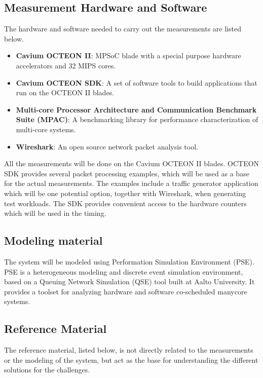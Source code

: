 \subsection{Measurement Hardware and Software}
The hardware and software needed to carry out the measurements are listed below.

\begin{itemize}

\item \textbf{Cavium OCTEON II}: MPSoC blade with a special purpose hardware accelerators and 32 MIPS cores.
\item \textbf{Cavium OCTEON SDK}: A set of software tools to build applications that run on the OCTEON II blades.
\item \textbf{Multi-core Processor Architecture and Communication Benchmark Suite (MPAC)}: A benchmarking library for performance characterization of multi-core systems.
\item \textbf{Wireshark}: An open source network packet analysis tool.

\end{itemize}

All the measurements will be done on the Cavium OCTEON II blades. OCTEON SDK provides several packet processing examples, which will be used as a base for the actual measurements. The examples include a traffic generator application which will be one potential option, together with Wireshark, when generating test workloads. The SDK provides convenient access to the hardware counters which will be used in the timing.

\subsection{Modeling material}
The system will be modeled using Performation Simulation Environment (PSE). PSE is a heterogeneous modeling and discrete event simulation environment, based on a Queuing Network Simulation (QSE) tool built at Aalto University. It provides a toolset for analyzing hardware and software co-scheduled manycore systems.

\subsection{Reference Material}
The reference material, listed below, is not directly related to the measurements or the modeling of the system, but act as the base for understanding the different solutions for the challenges.


